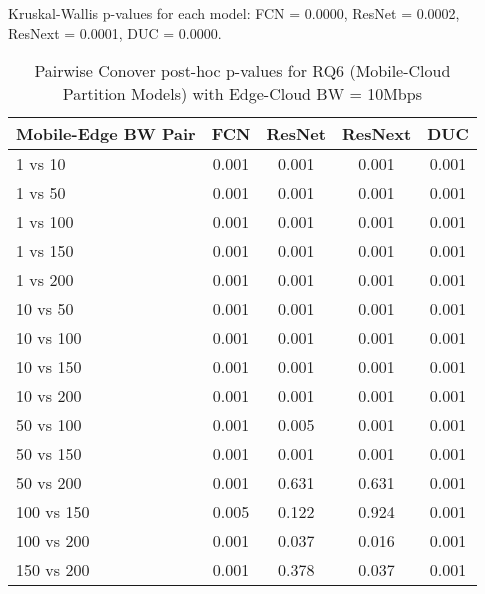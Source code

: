\begin{table}[h]
\centering
\caption{Pairwise Conover post-hoc p-values for RQ6 (Mobile-Cloud Partition Models) with Edge-Cloud BW = 10Mbps}
\label{tab:conover_mobile_cloud_partition_ec10}
\smallskip
Kruskal-Wallis p-values for each model: FCN = 0.0000, ResNet = 0.0002, ResNext = 0.0001, DUC = 0.0000.

\begin{tabular}{lcccc}
\toprule
Mobile-Edge BW Pair & FCN & ResNet & ResNext & DUC \\
\midrule
1 vs 10 & 0.001 & 0.001 & 0.001 & 0.001 \\
1 vs 50 & 0.001 & 0.001 & 0.001 & 0.001 \\
1 vs 100 & 0.001 & 0.001 & 0.001 & 0.001 \\
1 vs 150 & 0.001 & 0.001 & 0.001 & 0.001 \\
1 vs 200 & 0.001 & 0.001 & 0.001 & 0.001 \\
10 vs 50 & 0.001 & 0.001 & 0.001 & 0.001 \\
10 vs 100 & 0.001 & 0.001 & 0.001 & 0.001 \\
10 vs 150 & 0.001 & 0.001 & 0.001 & 0.001 \\
10 vs 200 & 0.001 & 0.001 & 0.001 & 0.001 \\
50 vs 100 & 0.001 & 0.005 & 0.001 & 0.001 \\
50 vs 150 & 0.001 & 0.001 & 0.001 & 0.001 \\
50 vs 200 & 0.001 & 0.631 & 0.631 & 0.001 \\
100 vs 150 & 0.005 & 0.122 & 0.924 & 0.001 \\
100 vs 200 & 0.001 & 0.037 & 0.016 & 0.001 \\
150 vs 200 & 0.001 & 0.378 & 0.037 & 0.001 \\
\bottomrule
\end{tabular}
\end{table}

